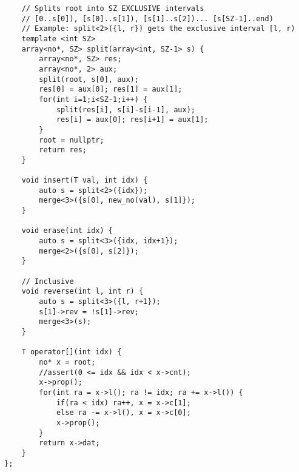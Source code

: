 \documentclass{article}
\begin{document}
\begin{verbatim}
	// Splits root into SZ EXCLUSIVE intervals
	// [0..s[0]), [s[0]..s[1]), [s[1]..s[2])... [s[SZ-1]..end)
	// Example: split<2>({l, r}) gets the exclusive interval [l, r)
	template <int SZ>
	array<no*, SZ> split(array<int, SZ-1> s) {
		array<no*, SZ> res;
		array<no*, 2> aux;
		split(root, s[0], aux);
		res[0] = aux[0]; res[1] = aux[1];
		for(int i=1;i<SZ-1;i++) {
			split(res[i], s[i]-s[i-1], aux);
			res[i] = aux[0]; res[i+1] = aux[1];
		}
		root = nullptr;
		return res;
	}

	void insert(T val, int idx) {
		auto s = split<2>({idx});
		merge<3>({s[0], new_no(val), s[1]});
	}
	
	void erase(int idx) {
		auto s = split<3>({idx, idx+1});
		merge<2>({s[0], s[2]});
	}

	// Inclusive
	void reverse(int l, int r) {
		auto s = split<3>({l, r+1});
		s[1]->rev = !s[1]->rev;
		merge<3>(s);
	}

	T operator[](int idx) {
		no* x = root;
		//assert(0 <= idx && idx < x->cnt);
		x->prop();
		for(int ra = x->l(); ra != idx; ra += x->l()) {
			if(ra < idx) ra++, x = x->c[1];
			else ra -= x->l(), x = x->c[0];
			x->prop();
		}
		return x->dat;
	}
};
\end{verbatim}
\end{document}
